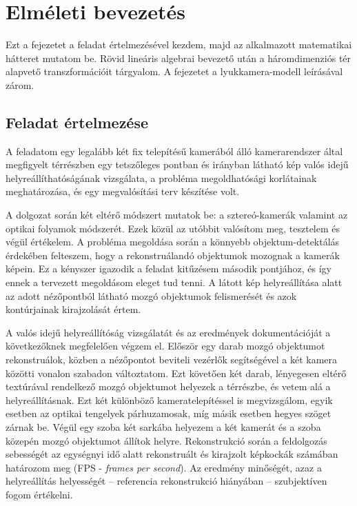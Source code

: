 \chapter{Elméleti bevezetés}\label{ch:elmelet}

Ezt a fejezetet a feladat értelmezésével kezdem, majd az alkalmazott matematikai hátteret mutatom be. Rövid lineáris algebrai bevezető után a háromdimenziós tér alapvető transzformációit tárgyalom. A fejezetet a lyukkamera-modell leírásával zárom.

\section{Feladat értelmezése}

A feladatom egy legalább két fix telepítésű kamerából álló kamerarendszer által megfigyelt térrészben egy tetszőleges pontban és irányban látható kép valós idejű helyreállíthatóságának vizsgálata, a probléma megoldhatósági korlátainak meghatározása, és egy megvalósítási terv készítése volt.

A dolgozat során két eltérő módszert mutatok be: a sztereó-kamerák valamint az optikai folyamok módszerét. Ezek közül az utóbbit valósítom meg, tesztelem és végül értékelem. A probléma megoldása során a könnyebb objektum-detektálás érdekében felteszem, hogy a rekonstruálandó objektumok mozognak a kamerák képein. Ez a kényszer igazodik a feladat kitűzésem második pontjához, és így ennek a tervezett megoldásom eleget tud tenni. A látott kép helyreállítása alatt az adott nézőpontból látható mozgó objektumok felismerését és azok kontúrjainak kirajzolását értem.

A valós idejű helyreállítóság vizsgálatát és az eredmények dokumentációját a következőknek megfelelően végzem el. Először egy darab mozgó objektumot rekonstruálok, közben a nézőpontot beviteli vezérlők segítségével a két kamera közötti vonalon szabadon változtatom. Ezt követően két darab, lényegesen eltérő textúrával rendelkező mozgó objektumot helyezek a térrészbe, és vetem alá a helyreállításnak. Ezt két különböző kameratelepítéssel is megvizsgálom, egyik esetben az optikai tengelyek párhuzamosak, míg másik esetben hegyes szöget zárnak be. Végül egy szoba két sarkába helyezem a két kamerát és a szoba közepén mozgó objektumot állítok helyre. Rekonstrukció során a feldolgozás sebességét az egységnyi idő alatt rekonstruált és kirajzolt képkockák számában határozom meg (FPS - \textit{frames per second}). Az eredmény minőségét, azaz a helyreállítás helyességét -- referencia rekonstrukció hiányában -- szubjektíven fogom értékelni.


